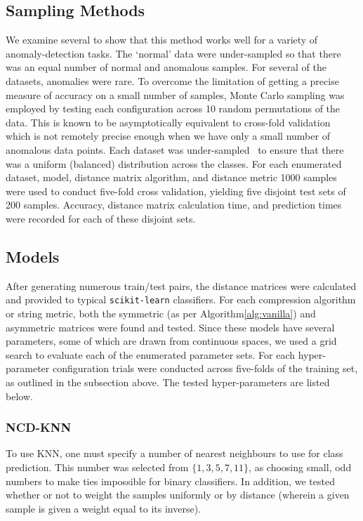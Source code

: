 \documentclass[conference]{IEEEtran}
\begin{document}
\subsection{Sampling Methods}
We examine several to show that this method works well for a variety of anomaly-detection tasks. The `normal' data were under-sampled so that there was an equal number of normal and anomalous samples. For several of the datasets, anomalies were rare. 
To overcome the limitation of getting a precise measure of accuracy on a small number of samples, Monte Carlo sampling was employed by testing each configuration across 10 random permutations of the data. 
This is known to be asymptotically equivalent to cross-fold validation~\cite{shan2022monte} which is not remotely precise enough when we have only a small number of anomalous data points. 
Each dataset was under-sampled~\cite{} to ensure that there was a uniform (balanced) distribution across the classes. 
For each enumerated dataset, model, distance matrix algorithm, and distance metric 1000 samples were used to conduct five-fold cross validation, yielding five disjoint test sets of 200 samples. 
Accuracy, distance matrix calculation time, and prediction times were recorded for each of these disjoint sets.


\subsection{Models}
\label{models}

After generating numerous train/test pairs, the distance matrices were calculated and provided to typical \texttt{scikit-learn} classifiers. For each compression algorithm or string metric, both the symmetric (as per  Algorithm\ref{alg:vanilla}) and asymmetric matrices were found and tested. Since these models have several parameters, some of which are drawn from continuous spaces, we used a grid search to evaluate each of the enumerated parameter sets. 
For each hyper-parameter configuration trials were conducted across five-folds of the training set, as outlined in the subsection above. 
The tested hyper-parameters are listed below.

\subsubsection{NCD-KNN}
To use KNN, one must specify a number of nearest neighbours to use for class prediction. This number was selected from $\{1,3,5,7,11\}$, as choosing small, odd numbers to make ties impossible for binary classifiers. In addition, we tested whether or not to weight the samples uniformly or by distance (wherein a given sample is given a weight equal to its inverse). 
\end{document}
